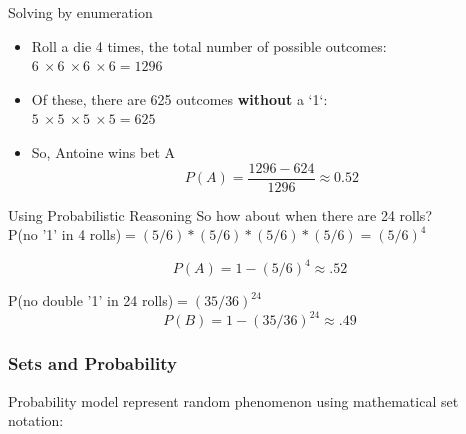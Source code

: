 \documentclass{beamer}
\numberwithin{equation}{section}
\begin{document}
\begin{frame}{Solving by enumeration}
\begin{itemize}
\item[] Roll a die 4 times, the total number of possible outcomes:\\ $6\ \times 6\ \times 6\ \times 6 = 1296$\pause
\item[] Of these, there are 625 outcomes \textbf{without} a `1`:\\  $5\ \times 5\ \times 5\ \times 5 = 625$\pause
\item[] So, Antoine wins bet A 
$$P(A)= \frac{1296-624}{1296} \approx 0.52$$
\end{itemize}
\end{frame}


\begin{frame}{Using Probabilistic Reasoning}
So how about when there are 24 rolls?\\
\vspace{1 cm}
\pause
\vspace{1 cm}
P(no '1' in 4 rolls)$ = (5/6)*(5/6)*(5/6)*(5/6)=(5/6)^4$

$$P(A) = 1- (5/6)^4\approx .52$$
\pause

\vspace{1 cm}

P(no double '1' in 24 rolls)$ = (35/36)^{24}$
$$P(B)=1-(35/36)^{24} \approx .49$$
\end{frame}


\begin{frame}
\frametitle{Sets and Probability}

Probability model represent random phenomenon using mathematical set notation:\pause 
\begin{itemize}
 \pause 
{} \pause 
{} 
\end{itemize}
\end{frame}
\end{document}
